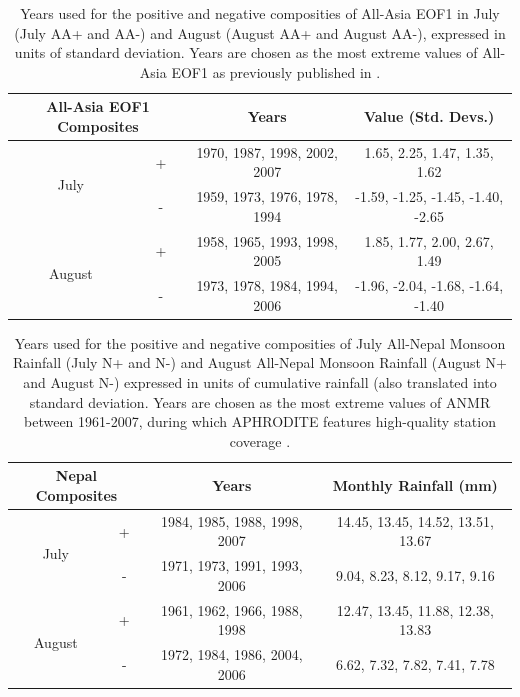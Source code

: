 \begin{table}[p]

\caption{Years used for the positive and negative composities of All-Asia EOF1 in July (July AA+ and AA-) and August (August AA+ and August AA-), expressed in units of standard deviation. Years are chosen as the most extreme values of All-Asia EOF1 as previously published in \citet{Day2015}.}
\centering

\begin{tabular}{ c c c c}
	 	 		\multicolumn{2}{c}{All-Asia EOF1 Composites} 	&			Years				&		Value (Std. Devs.)			\tabularnewline	
				\hline
	 \multirow{2}{*}{July} 		&  +							&	1970, 1987, 1998, 2002, 2007 	&	1.65, 2.25, 1.47, 1.35, 1.62		\tabularnewline
	 						&  -							&	1959, 1973, 1976, 1978, 1994       &	-1.59, -1.25, -1.45, -1.40, -2.65	\tabularnewline
	 \multirow{2}{*}{August}	&  + 							&	1958, 1965, 1993, 1998, 2005	&	1.85, 1.77, 2.00, 2.67, 1.49		\tabularnewline
	 						&  -  							&	1973, 1978, 1984, 1994, 2006	&	-1.96, -2.04, -1.68, -1.64, -1.40 	\tabularnewline

\end{tabular}
\label{tab:t41}
\end{table}

\begin{table}[p]

\caption{Years used for the positive and negative composities of July All-Nepal Monsoon Rainfall (July N+ and N-) and August All-Nepal Monsoon Rainfall (August N+ and August N-) expressed in units of cumulative rainfall (also translated into standard deviation. Years are chosen as the most extreme values of ANMR between 1961-2007, during which APHRODITE features high-quality station coverage \citep{Day2015}.}
\centering

\begin{tabular}{ c c c c}
	 	 		\multicolumn{2}{c}{Nepal Composites} 	&			Years				&			Monthly Rainfall (mm)		\tabularnewline	
				\hline
	 \multirow{2}{*}{July} 		&  +						&	1984, 1985, 1988, 1998, 2007 	&	14.45, 13.45, 14.52, 13.51, 13.67		\tabularnewline
	 						&  -						&	1971, 1973, 1991, 1993, 2006       &	9.04, 8.23, 8.12, 9.17, 9.16 			\tabularnewline
	 \multirow{2}{*}{August}	&  + 						&	1961, 1962, 1966, 1988, 1998	&	12.47, 13.45, 11.88, 12.38, 13.83		\tabularnewline
	 						&  -  						&	1972, 1984, 1986, 2004, 2006	&	6.62, 7.32, 7.82, 7.41, 7.78			\tabularnewline

\end{tabular}
\label{tab:t41}
\end{table}


